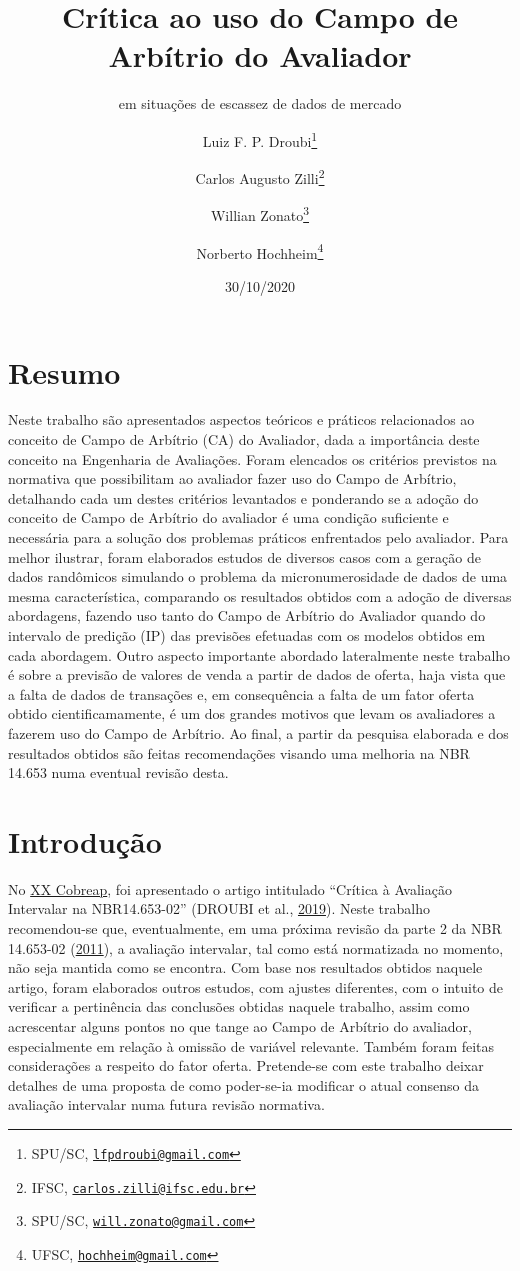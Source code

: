 \documentclass[
  a4paper, 11pt]{article}
\title{Crítica ao uso do Campo de Arbítrio do Avaliador}
\subtitle{em situações de escassez de dados de mercado}
\author{Luiz F. P. Droubi\footnote{SPU/SC,
  \href{mailto:lfpdroubi@gmail.com}{\nolinkurl{lfpdroubi@gmail.com}}} \and Carlos Augusto Zilli\footnote{IFSC,
  \href{mailto:carlos.zilli@ifsc.edu.br}{\nolinkurl{carlos.zilli@ifsc.edu.br}}} \and Willian Zonato\footnote{SPU/SC,
  \href{mailto:will.zonato@gmail.com}{\nolinkurl{will.zonato@gmail.com}}} \and Norberto Hochheim\footnote{UFSC,
  \href{mailto:hochheim@gmail.com}{\nolinkurl{hochheim@gmail.com}}}}
\date{30/10/2020}
\begin{document}
\maketitle

\hypertarget{resumo}{%
\section*{Resumo}\label{resumo}}

Neste trabalho são apresentados aspectos teóricos e práticos
relacionados ao conceito de Campo de Arbítrio (CA) do Avaliador, dada a
importância deste conceito na Engenharia de Avaliações. Foram elencados
os critérios previstos na normativa que possibilitam ao avaliador fazer
uso do Campo de Arbítrio, detalhando cada um destes critérios levantados
e ponderando se a adoção do conceito de Campo de Arbítrio do avaliador é
uma condição suficiente e necessária para a solução dos problemas
práticos enfrentados pelo avaliador. Para melhor ilustrar, foram
elaborados estudos de diversos casos com a geração de dados randômicos
simulando o problema da micronumerosidade de dados de uma mesma
característica, comparando os resultados obtidos com a adoção de
diversas abordagens, fazendo uso tanto do Campo de Arbítrio do Avaliador
quando do intervalo de predição (IP) das previsões efetuadas com os
modelos obtidos em cada abordagem. Outro aspecto importante abordado
lateralmente neste trabalho é sobre a previsão de valores de venda a
partir de dados de oferta, haja vista que a falta de dados de transações
e, em consequência a falta de um fator oferta obtido cientificamamente,
é um dos grandes motivos que levam os avaliadores a fazerem uso do Campo
de Arbítrio. Ao final, a partir da pesquisa elaborada e dos resultados
obtidos são feitas recomendações visando uma melhoria na NBR 14.653 numa
eventual revisão desta.

\hypertarget{introduuxe7uxe3o}{%
\section{Introdução}\label{introduuxe7uxe3o}}

No \href{http://www.cobreap.com.br/2019/}{XX Cobreap}, foi apresentado o
artigo intitulado ``Crítica à Avaliação Intervalar na NBR14.653-02''
(DROUBI et al., \protect\hyperlink{ref-droubi2019}{2019}). Neste
trabalho recomendou-se que, eventualmente, em uma próxima revisão da
parte 2 da NBR 14.653-02 (\protect\hyperlink{ref-NBR1465302}{2011}), a
avaliação intervalar, tal como está normatizada no momento, não seja
mantida como se encontra. Com base nos resultados obtidos naquele
artigo, foram elaborados outros estudos, com ajustes diferentes, com o
intuito de verificar a pertinência das conclusões obtidas naquele
trabalho, assim como acrescentar alguns pontos no que tange ao Campo de
Arbítrio do avaliador, especialmente em relação à omissão de variável
relevante. Também foram feitas considerações a respeito do fator oferta.
Pretende-se com este trabalho deixar detalhes de uma proposta de como
poder-se-ia modificar o atual consenso da avaliação intervalar numa
futura revisão normativa.
\end{document}
